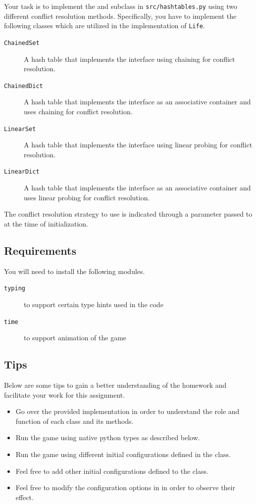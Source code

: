 \documentclass[addpoints]{exam}
\begin{document}
Your task is to implement the  and  subclass in \texttt{src/hashtables.py} using two different conflict resolution methods. Specifically, you have to implement the following classes which are utilized in the implementation of \texttt{Life}.
\begin{description}
\item[\texttt{ChainedSet}] A hash table that implements the  interface using chaining for conflict resolution.
\item[\texttt{ChainedDict}] A hash table that implements the  interface as an associative container and uses chaining for conflict resolution.
\item[\texttt{LinearSet}] A hash table that implements the  interface using linear probing for conflict resolution.
\item[\texttt{LinearDict}] A hash table that implements the  interface as an associative container and uses linear probing for conflict resolution.
\end{description}
The conflict resolution strategy to use is indicated through a parameter passed to  at the time of initialization.

\subsection{Requirements}

You will need to install the following modules.
\begin{description}
\item [\texttt{typing}] to support certain type hints used in the code
\item [\texttt{time}] to support animation of the game
\end{description}

\subsection{Tips}

Below are some tips to gain a better understanding of the homework and facilitate your work for this assignment.
\begin{itemize}
\item Go over the provided implementation in order to understand the role and function of each class and its methods.
\item Run the game using native python types as described below.
\item Run the game using different initial configurations defined in the  class.
\item Feel free to add other initial configurations defined to the  class.
\item Feel free to modify the configuration options in  in order to observe their effect.
\end{itemize}
\end{document}
